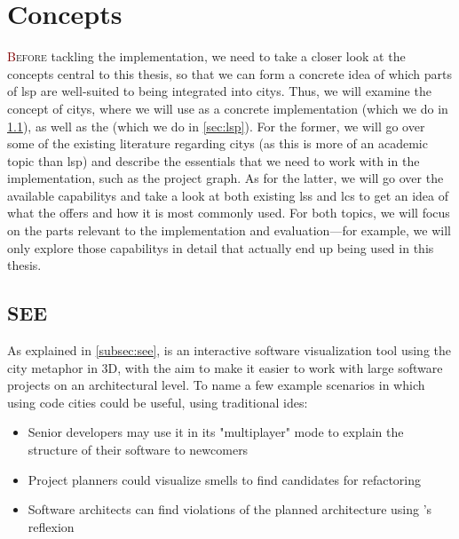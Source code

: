 \documentclass[../thesis]{subfiles}
\begin{document}
\chapter{Concepts}\label{ch:concepts}

\lettrine[lines=3]{\textcolor{Maroon}{B}}{efore} tackling the implementation, we need to take a closer look at the concepts central to this thesis, so that we can form a concrete idea of which parts of \gls{lsp} are well-suited to being integrated into \glspl{city}.
Thus, we will examine the concept of \glspl{city}, where we will use \SEE{} as a concrete implementation (which we do in \cref{sec:see}), as well as the  (which we do in \cref{sec:lsp}).
For the former, we will go over some of the existing literature regarding \glspl{city} (as this is more of an academic topic than \gls{lsp}) and describe the essentials that we need to work with in the implementation, such as the project graph.
As for the latter, we will go over the available \glspl{capability} and take a look at both existing \glspl{ls} and \glspl{lc} to get an idea of what the  offers and how it is most commonly used.
For both topics, we will focus on the parts relevant to the implementation and evaluation---for example, we will only explore those \glspl{capability} in detail that actually end up being used in this thesis.

\section{SEE}\label{sec:see}

As explained in \cref{subsec:see}, \SEE{} is an interactive software visualization tool using the \gls{city} metaphor in 3D, with the aim to make it easier to work with large software projects on an architectural level.
To name a few example scenarios in which using code cities could be useful,  using traditional \glspl{ide}:
\begin{itemize}
	\item Senior developers may use it in its "multiplayer" mode to explain the structure of their software to newcomers
	\item Project planners could visualize \glspl{smell} to find candidates for refactoring~\cite{falko}
	\item Software architects can find violations of the planned architecture using \SEE{}'s \gls{reflexion}
\end{itemize}
\end{document}
